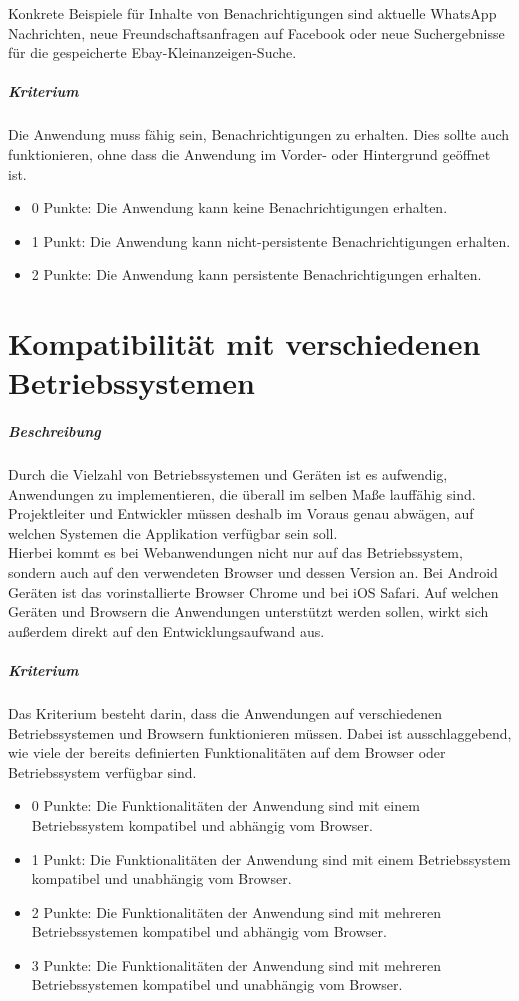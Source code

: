 Konkrete Beispiele für Inhalte von Benachrichtigungen sind aktuelle WhatsApp Nachrichten, neue Freundschaftsanfragen auf Facebook oder neue Suchergebnisse für die gespeicherte Ebay-Kleinanzeigen-Suche.

\subparagraph{Kriterium\\}
Die Anwendung muss fähig sein, Benachrichtigungen zu erhalten.
Dies sollte auch funktionieren, ohne dass die Anwendung im Vorder- oder Hintergrund geöffnet ist.

\begin{itemize}
\item 0 Punkte: Die Anwendung kann keine Benachrichtigungen erhalten.
\item 1 Punkt: Die Anwendung kann nicht-persistente Benachrichtigungen erhalten.
\item 2 Punkte: Die Anwendung kann persistente Benachrichtigungen erhalten.
\end{itemize}

\section{Kompatibilität mit verschiedenen Betriebssystemen}
\subparagraph{Beschreibung\\}
Durch die Vielzahl von Betriebssystemen und Geräten ist es aufwendig, Anwendungen zu implementieren, die überall im selben Maße lauffähig sind.
Projektleiter und Entwickler müssen deshalb im Voraus genau abwägen, auf welchen Systemen die Applikation verfügbar sein soll.\\
Hierbei kommt es bei Webanwendungen nicht nur auf das Betriebssystem, sondern auch auf den verwendeten Browser und dessen Version an.
Bei Android Geräten ist das vorinstallierte Browser Chrome und bei iOS Safari.
Auf welchen Geräten und Browsern die Anwendungen unterstützt werden sollen, wirkt sich außerdem direkt auf den Entwicklungsaufwand aus.

\subparagraph{Kriterium}
Das Kriterium besteht darin, dass die Anwendungen auf verschiedenen Betriebssystemen und Browsern funktionieren müssen.
Dabei ist ausschlaggebend, wie viele der bereits definierten Funktionalitäten auf dem Browser oder Betriebssystem verfügbar sind.

\begin{itemize}
\item 0 Punkte: Die Funktionalitäten der Anwendung sind mit einem Betriebssystem kompatibel und abhängig vom Browser.
\item 1 Punkt: Die Funktionalitäten der Anwendung sind mit einem Betriebssystem kompatibel und unabhängig vom Browser.
\item 2 Punkte: Die Funktionalitäten der Anwendung sind mit mehreren Betriebssystemen kompatibel und abhängig vom Browser.
\item 3 Punkte: Die Funktionalitäten der Anwendung sind mit mehreren Betriebssystemen kompatibel und unabhängig vom Browser.
\end{itemize}

